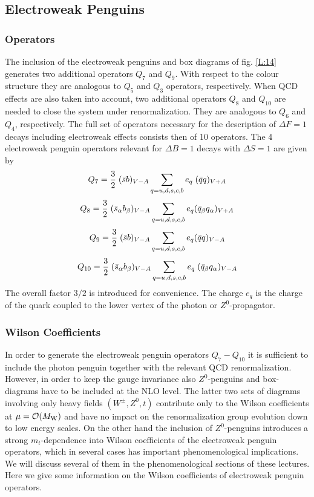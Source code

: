 \documentclass[12pt]{article}
\newcommand{\mw}{M_{\rm W}}
\newcommand{\be}{\begin{equation}}
\newcommand{\ee}{\end{equation}}
\newcommand{\ord}{{\cal O}}
\begin{document}
\begin{itemize}
\begin{itemize}
\subsection{Electroweak Penguins}
\subsubsection{Operators}
The inclusion of the electroweak penguins and box diagrams of 
fig. \ref{L:14}
generates two additional operators $Q_7$ and $Q_9$. With respect to
the colour structure they are analogous to $Q_5$ and $Q_3$ operators,
respectively. When QCD effects are also taken into account, two
additional operators $Q_8$ and $Q_{10}$ are needed to close the system
under renormalization. They are analogous to $Q_6$ and $Q_4$, respectively.
The full set of operators necessary for the description of
$\Delta F=1$ decays including electroweak effects consists 
then of 10 operators.
The 4 electroweak penguin operators relevant for $\Delta B=1$ decays
with $\Delta S=1$ are given by
\begin{equation}\label{O4} 
Q_7 = {3\over 2}\;(\bar s b)_{V-A}\sum_{q=u,d,s,c,b}e_q\;(\bar qq)_{V+A} 
\ee
\be\label{O4a}
 Q_8 = {3\over2}\;(\bar s_{\alpha} b_{\beta})_{V-A}\sum_{q=u,d,s,c,b}e_q
        (\bar q_{\beta} q_{\alpha})_{V+A}
\end{equation}
\begin{equation}\label{O5} 
 Q_9 = {3\over 2}\;(\bar s b)_{V-A}\sum_{q=u,d,s,c,b}e_q(\bar q q)_{V-A}
\ee
\be\label{O6}
Q_{10} ={3\over 2}\;
(\bar s_{\alpha} b_{\beta})_{V-A}\sum_{q=u,d,s,c,b}e_q\;
       (\bar q_{\beta}q_{\alpha})_{V-A} 
\end{equation}
The overall factor $3/2$ is introduced for convenience. The charge
$e_q$ is the charge of the quark coupled to the lower vertex of the
photon or $Z^0$-propagator.
\subsubsection{Wilson Coefficients}
In order to generate the electroweak penguin operators $Q_7-Q_{10}$
it is sufficient to include the photon penguin together with the
relevant QCD renormalization. However, in order to keep the gauge
invariance also $Z^0$-penguins and box-diagrams have to be included
at the NLO level. The latter two sets of diagrams involving only
heavy fields $(W^\pm,Z^0,t)$ contribute only to the Wilson coefficients
at $\mu=\ord(\mw)$ and have no impact on the renormalization group
evolution down to low energy scales. On the other hand the inclusion
of $Z^0$-penguins introduces a strong $m_t$-dependence into Wilson
coefficients of the electroweak penguin operators, which in several
cases has important phenomenological implications. We will discuss
several of them in the phenomenological sections of these lectures. 
Here we
give some information on the Wilson coefficients of electroweak
penguin operators.


\end{itemize}
\end{itemize}
\end{document}
